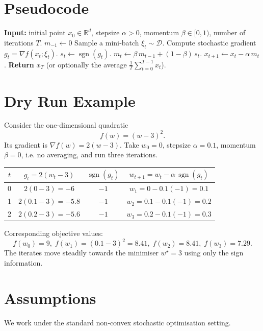 \documentclass[11pt]{article}
\begin{document}
\section*{Pseudocode}
\begin{algorithm}[H]
\caption{SignSGD with Momentum}
\begin{algorithmic}[1]
\State \textbf{Input:} initial point $x_{0}\in\mathbb{R}^{d}$, stepsize $\alpha>0$, momentum $\beta\in[0,1)$, number of iterations $T$.
\State $m_{-1}\gets 0$ 
    \State Sample a mini‑batch $\xi_{t}\sim\mathcal{D}$.
    \State Compute stochastic gradient $g_{t}= \nabla f(x_{t};\xi_{t})$.
    \State $s_{t}\gets \operatorname{sgn}(g_{t})$.
    \State $m_{t}\gets \beta\, m_{t-1} + (1-\beta)\,s_{t}$.
    \State $x_{t+1}\gets x_{t} - \alpha\, m_{t}$.
\EndFor
\State \textbf{Return} $x_{T}$ (or optionally the average $\frac{1}{T}\sum_{t=0}^{T-1}x_{t}$).
\end{algorithmic}
\end{algorithm}

\section*{Dry Run Example}
Consider the one‑dimensional quadratic 
\[
    f(w)=(w-3)^{2}.
\]
Its gradient is $\nabla f(w)=2(w-3)$.  
Take $w_{0}=0$, stepsize $\alpha=0.1$, momentum $\beta=0$, i.e. no averaging, and run three iterations.

\begin{center}
\begin{tabular}{c|c|c|c}
$t$ & $g_{t}=2(w_{t}-3)$ & $\operatorname{sgn}(g_{t})$ & $w_{t+1}=w_{t}-\alpha\,\operatorname{sgn}(g_{t})$ \\ \hline
0 & $2(0-3)=-6$ & $-1$ & $w_{1}=0-0.1(-1)=0.1$\\
1 & $2(0.1-3)=-5.8$ & $-1$ & $w_{2}=0.1-0.1(-1)=0.2$\\
2 & $2(0.2-3)=-5.6$ & $-1$ & $w_{3}=0.2-0.1(-1)=0.3$
\end{tabular}
\end{center}

Corresponding objective values:
\[
    f(w_{0})=9,\; f(w_{1})=(0.1-3)^{2}=8.41,\; f(w_{2})=8.41,\; f(w_{3})=7.29.
\]
The iterates move steadily towards the minimiser $w^{\star}=3$ using only the sign information.

\newpage
\section*{Assumptions}
We work under the standard non‑convex stochastic optimisation setting.
\end{document}
